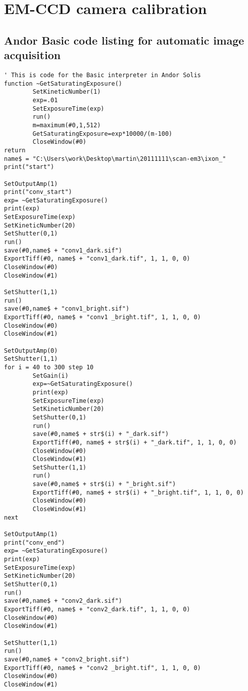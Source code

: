 \chapter{EM-CCD camera calibration}
\section{Andor Basic code listing for automatic image acquisition}
\label{sec:basic-acquisition}



\begin{lstlisting}[style=mybasic]
' This is code for the Basic interpreter in Andor Solis
function ~GetSaturatingExposure()
        SetKineticNumber(1)
        exp=.01
        SetExposureTime(exp)
        run()
        m=maximum(#0,1,512)
        GetSaturatingExposure=exp*10000/(m-100)
        CloseWindow(#0)
return
name$ = "C:\Users\work\Desktop\martin\20111111\scan-em3\ixon_"
print("start")

SetOutputAmp(1)
print("conv_start")
exp= ~GetSaturatingExposure()
print(exp)
SetExposureTime(exp)
SetKineticNumber(20)
SetShutter(0,1)
run()
save(#0,name$ + "conv1_dark.sif")
ExportTiff(#0, name$ + "conv1_dark.tif", 1, 1, 0, 0)
CloseWindow(#0)
CloseWindow(#1)
        
SetShutter(1,1)
run()
save(#0,name$ + "conv1_bright.sif")
ExportTiff(#0, name$ + "conv1 _bright.tif", 1, 1, 0, 0)
CloseWindow(#0)
CloseWindow(#1)

SetOutputAmp(0)
SetShutter(1,1)
for i = 40 to 300 step 10
        SetGain(i)
        exp=~GetSaturatingExposure()
        print(exp)
        SetExposureTime(exp)
        SetKineticNumber(20)
        SetShutter(0,1)
        run()
        save(#0,name$ + str$(i) + "_dark.sif")
        ExportTiff(#0, name$ + str$(i) + "_dark.tif", 1, 1, 0, 0)
        CloseWindow(#0)
        CloseWindow(#1)
        SetShutter(1,1)
        run()
        save(#0,name$ + str$(i) + "_bright.sif")
        ExportTiff(#0, name$ + str$(i) + "_bright.tif", 1, 1, 0, 0)
        CloseWindow(#0)
        CloseWindow(#1)
next

SetOutputAmp(1)
print("conv_end")
exp= ~GetSaturatingExposure()
print(exp)
SetExposureTime(exp)
SetKineticNumber(20)
SetShutter(0,1)
run()
save(#0,name$ + "conv2_dark.sif")
ExportTiff(#0, name$ + "conv2_dark.tif", 1, 1, 0, 0)
CloseWindow(#0)
CloseWindow(#1)
        
SetShutter(1,1)
run()
save(#0,name$ + "conv2_bright.sif")
ExportTiff(#0, name$ + "conv2 _bright.tif", 1, 1, 0, 0)
CloseWindow(#0)
CloseWindow(#1)
\end{lstlisting}

